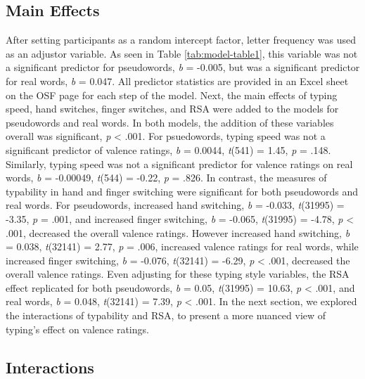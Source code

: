 \documentclass[english,man]{apa6}
\theoremstyle{definition}
\theoremstyle{definition}
\theoremstyle{definition}
\theoremstyle{remark}
\begin{document}
\subsection{Main Effects}\label{main-effects}

After setting participants as a random intercept factor, letter
frequency was used as an adjustor variable. As seen in Table
\ref{tab:model-table1}, this variable was not a significant predictor
for pseudowords, \emph{b} = -0.005, but was a significant predictor for
real words, \emph{b} = 0.047. All predictor statistics are provided in
an Excel sheet on the OSF page for each step of the model. Next, the
main effects of typing speed, hand switches, finger switches, and RSA
were added to the models for pseudowords and real words. In both models,
the addition of these variables overall was significant, \emph{p}
\textless{} .001. For psuedowords, typing speed was not a significant
predictor of valence ratings, \emph{b} = 0.0044, \emph{t}(541) = 1.45,
\emph{p} = .148. Similarly, typing speed was not a significant predictor
for valence ratings on real words, \emph{b} = -0.00049, \emph{t}(544) =
-0.22, \emph{p} = .826. In contrast, the measures of typability in hand
and finger switching were significant for both pseudowords and real
words. For pseudowords, increased hand switching, \emph{b} = -0.033,
\emph{t}(31995) = -3.35, \emph{p} = .001, and increased finger
switching, \emph{b} = -0.065, \emph{t}(31995) = -4.78, \emph{p}
\textless{} .001, decreased the overall valence ratings. However
increased hand switching, \emph{b} = 0.038, \emph{t}(32141) = 2.77,
\emph{p} = .006, increased valence ratings for real words, while
increased finger switching, \emph{b} = -0.076, \emph{t}(32141) = -6.29,
\emph{p} \textless{} .001, decreased the overall valence ratings. Even
adjusting for these typing style variables, the RSA effect replicated
for both pseudowords, \emph{b} = 0.05, \emph{t}(31995) = 10.63, \emph{p}
\textless{} .001, and real words, \emph{b} = 0.048, \emph{t}(32141) =
7.39, \emph{p} \textless{} .001. In the next section, we explored the
interactions of typability and RSA, to present a more nuanced view of
typing's effect on valence ratings.

\subsection{Interactions}\label{interactions}
\end{document}
